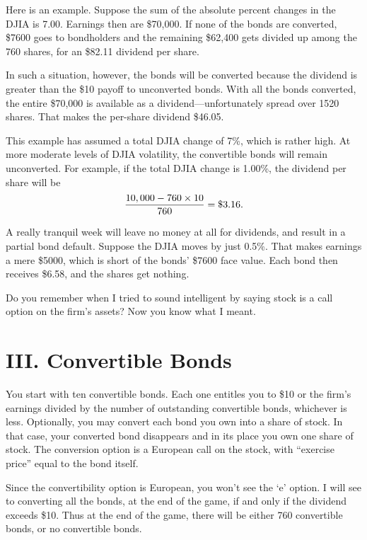Here is an example.  Suppose the sum of the absolute percent changes
in the DJIA is 7.00.  Earnings then are \$70,000.  If none of the
bonds are converted, \$7600 goes to bondholders and the remaining
\$62,400 gets divided up among the 760 shares, for an \$82.11
dividend per share.

In such a situation, however, the bonds will be converted because the
dividend is greater than the \$10 payoff to unconverted bonds.  With
all the bonds converted, the entire \$70,000 is available as a
dividend---unfortunately spread over 1520 shares.  That makes the
per-share dividend \$46.05.

This example has assumed a total DJIA change of 7\%, which is rather
high.  At more moderate levels of DJIA volatility, the convertible
bonds will remain unconverted.  For example, if the total DJIA change
is 1.00\%, the dividend per share will be
$$
{10,000 - 760\times10\over 760} = \$3.16.
$$

A really tranquil week will leave no money at all for dividends, and
result in a partial bond default.  Suppose the DJIA moves by just 0.5\%.
That makes earnings a mere \$5000, which is short of the bonds' \$7600
face value.  Each bond then receives \$6.58, and the shares get nothing.

Do you remember when I tried to sound intelligent by saying stock is
a call option on the firm's assets?  Now you know what I meant.%

\section{III. Convertible Bonds}%
You start with ten convertible bonds.  Each one entitles you to \$10
or the firm's earnings divided by the number of outstanding
convertible bonds, whichever is less.  Optionally, you may convert
each bond you own into a share of stock.  In that case, your
converted bond disappears and in its place you own one share of
stock.  The conversion option is a European call on the stock, with
``exercise price'' equal to the bond itself.%

Since the convertibility option is European, you won't see the `e'
option.  I will see to converting all the bonds, at the end of the
game, if and only if the dividend exceeds \$10.  Thus at the end of
the game, there will be either 760 convertible bonds, or no
convertible bonds.

